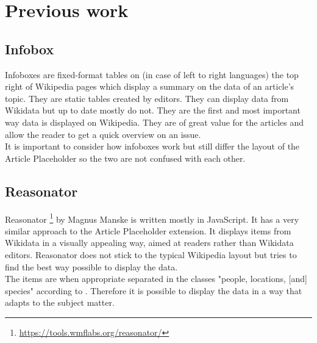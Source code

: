 \chapter{Previous work}
\section{Infobox}
Infoboxes are fixed-format tables on (in case of left to right languages) the top right of Wikipedia pages which display a summary on the data of an article's topic. \citep{wiki:05} They are static tables created by editors. They can display data from Wikidata but up to date mostly do not. They are the first and most important way data is displayed on Wikipedia. They are of great value for the articles and allow the reader to get a quick overview on an issue. \\
It is important to consider how infoboxes work but still differ the layout of the Article Placeholder so the two are not confused with each other.

\section{Reasonator}
Reasonator \footnote{\url{https://tools.wmflabs.org/reasonator/}} by Magnus Manske is written mostly in JavaScript. It has a very similar approach to the Article Placeholder extension. It displays items from Wikidata in a visually appealing way, aimed at readers rather than Wikidata editors. Reasonator does not stick to the typical Wikipedia layout but tries to find the best way possible to display the data. \\
The items are when appropriate separated in the classes  "people, locations, [and] species" according to \citet{wiki:06}. Therefore it is possible to display the data in a way that adapts to the subject matter. \\

